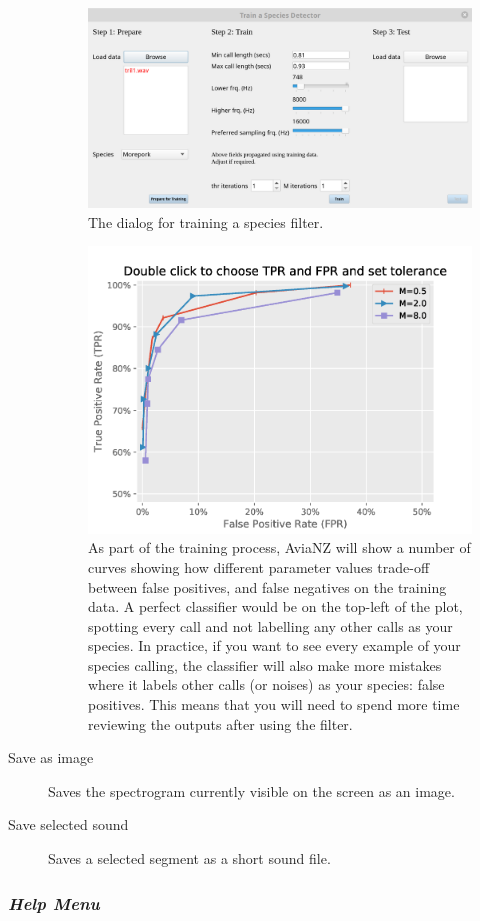 \documentclass{article}
\begin{document}
\begin{description}
    \begin{figure}
    \centering
    \includegraphics[width=.6\textwidth]{Figs/train}
    \caption{The dialog for training a species filter.}
    \label{fig:train}
    \end{figure}

    \begin{figure}
    \centering
    \includegraphics[width=.4\textwidth]{Figs/ROC_Curve_zoom}
    \caption{As part of the training process, AviaNZ will show a number of curves showing how different parameter values trade-off between false positives, and false negatives on the training data. A perfect classifier would be on the top-left of the plot, spotting every call and not labelling any other calls as your species. In practice, if you want to see every example of your species calling, the classifier will also make more mistakes where it labels other calls (or noises) as your species: false positives. This means that you will need to spend more time reviewing the outputs after using the filter. }
    \label{fig:selectfilter}
    \end{figure}

\item [Save as image] Saves the spectrogram currently visible on the screen as an image.
\item [Save selected sound] Saves a selected segment as a short sound file.
\end{description}

\subsubsection{{\em Help Menu}}
\end{document}
